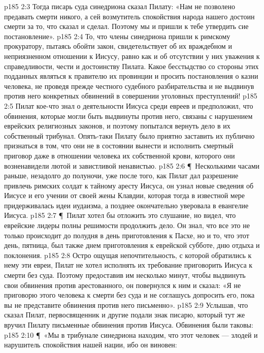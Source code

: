 \vs p185 2:3 Тогда писарь суда синедриона сказал Пилату: «Нам не позволено предавать смерти никого, а сей возмутитель спокойствия народа нашего достоин смерти за то, что сказал и сделал. Поэтому мы и пришли к тебе утвердить сие постановление».
\vs p185 2:4 То, что члены синедриона пришли к римскому прокуратору, пытаясь обойти закон, свидетельствует об их враждебном и неприязненном отношении к Иисусу, равно как и об отсутствии у них уважения к справедливости, чести и достоинству Пилата. Какое бесстыдство со стороны этих подданных являться к правителю их провинции и просить постановления о казни человека, не проведя прежде честного судебного разбирательства и не выдвинув против него конкретных обвинений в совершении уголовных преступлений!
\vs p185 2:5 Пилат кое\hyp{}что знал о деятельности Иисуса среди евреев и предположил, что обвинения, которые могли быть выдвинуты против него, связаны с нарушением еврейских религиозных законов, и поэтому попытался вернуть дело в их собственный трибунал. Опять\hyp{}таки Пилату было приятно заставить их публично признаться в том, что они не в состоянии вынести и исполнить смертный приговор даже в отношении человека их собственной крови, которого они возненавидели лютой и завистливой ненавистью.
\vs p185 2:6 \P\ Несколькими часами раньше, незадолго до полуночи, уже после того, как Пилат дал разрешение привлечь римских солдат к тайному аресту Иисуса, он узнал новые сведения об Иисусе и его учении от своей жены Клавдии, которая тогда в известной мере придерживалась идеи иудаизма, а позднее окончательно уверовала в евангелие Иисуса.
\vs p185 2:7 \P\ Пилат хотел бы отложить это слушание, но видел, что еврейские лидеры полны решимости продолжить дело. Он знал, что все это не только происходит до полудня в день приготовления к Пасхе, но и то, что этот день, пятница, был также днем приготовления к еврейской субботе, дню отдыха и поклонения.
\vs p185 2:8 Остро ощущая непочтительность, с которой обратились к нему эти евреи, Пилат не хотел исполнять их требование приговорить Иисуса к смерти без суда. Поэтому предоставив им несколько минут, чтобы выдвинуть свои обвинения против арестованного, он повернулся к ним и сказал: «Я не приговорю этого человека к смерти без суда и не соглашусь допросить его, пока вы не представите обвинения против него письменно».
\vs p185 2:9 Услышав, что сказал Пилат, первосвященник и другие подали знак писарю, который тут же вручил Пилату письменные обвинения против Иисуса. Обвинения были таковы:
\vs p185 2:10 \P\ «Мы в трибунале синедриона находим, что этот человек --- злодей и нарушитель спокойствия нашей нации, ибо он виновен:
